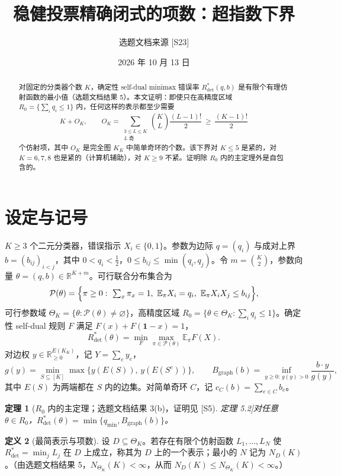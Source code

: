 \documentclass[11pt,a4paper]{article}
\title{稳健投票精确闭式的项数：超指数下界}
\author{选题文档来源 [S23]}
\date{2026 年 10 月 13 日}
\newtheorem{theorem}{定理}
\theoremstyle{definition}
\newtheorem{definition}[theorem]{定义}
\newcommand{\Rdet}{R^*_{\mathrm{det}}}
\newcommand{\Bg}{B_{\mathrm{graph}}}
\begin{document}
\maketitle

\begin{abstract}
对固定的分类器个数 $K$，确定性 self-dual minimax 错误率 $\Rdet(q,b)$ 是有限个有理仿射函数的最小值（选题文档结果 5）。本文证明：即使只在高精度区域 $R_0=\{\sum_iq_i\le1\}$ 内，任何这样的表示都至少需要
\[
K+O_K,\qquad O_K=\sum_{\substack{3\le L\le K\\ L\text{ 奇}}}\binom KL\frac{(L-1)!}{2}\ \ge\ \frac{(K-1)!}{2}
\]
个仿射项，其中 $O_K$ 是完全图 $K_K$ 中简单奇环的个数。该下界对 $K\le5$ 是紧的，对 $K=6,7,8$ 也是紧的（计算机辅助），对 $K\ge9$ 不紧。证明除 $R_0$ 内的主定理外是自包含的。
\end{abstract}

\section{设定与记号}
$K\ge3$ 个二元分类器，错误指示 $X_i\in\{0,1\}$。参数为边际 $q=(q_i)$ 与成对上界 $b=(b_{ij})_{i<j}$，其中 $0<q_i<\tfrac12$，$0\le b_{ij}\le\min(q_i,q_j)$。令 $m=\binom K2$，参数向量 $\theta=(q,b)\in\mathbb R^{K+m}$。可行联合分布集合为
\[
\mathcal P(\theta)=\Bigl\{\pi\ge0:\ \textstyle\sum_x\pi_x=1,\ \mathbb E_\pi X_i=q_i,\ \mathbb E_\pi X_iX_j\le b_{ij}\Bigr\},
\]
可行参数域 $\Theta_K=\{\theta:\mathcal P(\theta)\neq\varnothing\}$，高精度区域 $R_0=\{\theta\in\Theta_K:\sum_iq_i\le1\}$。确定性 self-dual 规则 $F$ 满足 $F(x)+F(\mathbf1-x)=1$，
\[
\Rdet(\theta)=\min_F\max_{\pi\in\mathcal P(\theta)}\mathbb E_\pi F(X).
\]
对边权 $y\in\mathbb R_{\ge0}^{E(K_K)}$，记 $Y=\sum_ey_e$，
\[
g(y)=\min_{S\subseteq[K]}\max\{y(E(S)),\,y(E(S^c))\},\qquad
\Bg(b)=\inf_{y\ge0:\,g(y)>0}\frac{b\cdot y}{g(y)},
\]
其中 $E(S)$ 为两端都在 $S$ 内的边集。对简单奇环 $C$，记 $c_C(b)=\sum_{e\in C}b_e$。

\begin{theorem}[$R_0$ 内的主定理；选题文档结果 3(b)，证明见 [S5] 定理 5.2]\label{thm:main}
对任意 $\theta\in R_0$，$\Rdet(\theta)=\min\{q_{\min},\Bg(b)\}$。
\end{theorem}

\begin{definition}[最简表示与项数]
设 $D\subseteq\Theta_K$。若存在有限个仿射函数 $L_1,\dots,L_N$ 使 $\Rdet=\min_jL_j$ 在 $D$ 上成立，称其为 $D$ 上的一个表示；最小的 $N$ 记为 $N_D(K)$。（由选题文档结果 5，$N_{\Theta_K}(K)<\infty$，从而 $N_D(K)\le N_{\Theta_K}(K)<\infty$。）
\end{definition}
\end{document}
